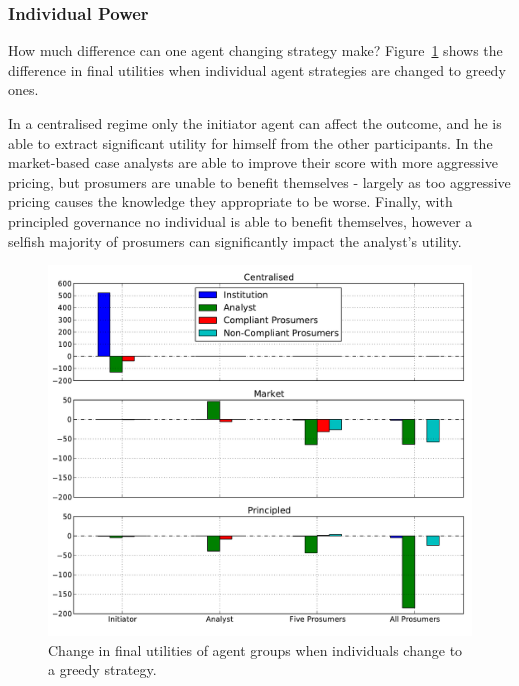 

\subsubsection{Individual Power}

How much difference can one agent changing strategy make? Figure~\ref{fig:powerbar} shows the difference in final utilities when individual agent strategies are changed to greedy ones. 

In a centralised regime only the initiator agent can affect the outcome, and he is able to extract significant utility for himself from the other participants. In the market-based case analysts are able to improve their score with more aggressive pricing, but prosumers are unable to benefit themselves - largely as too aggressive pricing causes the knowledge they appropriate to be worse. Finally, with principled governance no individual is able to benefit themselves, however a selfish majority of prosumers can significantly impact the analyst's utility.

\begin{figure}
\includegraphics{gfx/kc/powerbar.pdf} 
\caption{Change in final utilities of agent groups when individuals change to a greedy strategy.}\label{fig:powerbar}
\end{figure}

